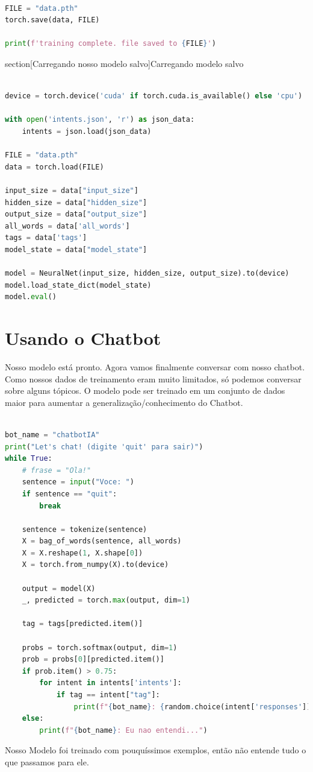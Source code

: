 \begin{lstlisting}[language=Python, caption=Salvando o modelo treinado]

FILE = "data.pth"
torch.save(data, FILE)

print(f'training complete. file saved to {FILE}')

\end{lstlisting}

section[Carregando nosso modelo salvo]{Carregando modelo salvo}

\begin{lstlisting}[language=Python, caption=Carregando modelo salvo]

device = torch.device('cuda' if torch.cuda.is_available() else 'cpu')

with open('intents.json', 'r') as json_data:
    intents = json.load(json_data)

FILE = "data.pth"
data = torch.load(FILE)

input_size = data["input_size"]
hidden_size = data["hidden_size"]
output_size = data["output_size"]
all_words = data['all_words']
tags = data['tags']
model_state = data["model_state"]

model = NeuralNet(input_size, hidden_size, output_size).to(device)
model.load_state_dict(model_state)
model.eval()

\end{lstlisting}

\section[Usando o Chatbot]{Usando o Chatbot}

Nosso modelo está pronto. Agora vamos finalmente conversar com nosso chatbot. Como nossos dados de treinamento eram muito limitados, só podemos conversar sobre alguns tópicos. O modelo pode ser treinado em um conjunto de dados maior para aumentar a generalização/conhecimento do Chatbot.

\begin{lstlisting}[language=Python, caption=Chatbot]

bot_name = "chatbotIA"
print("Let's chat! (digite 'quit' para sair)")
while True:
    # frase = "Ola!"
    sentence = input("Voce: ")
    if sentence == "quit":
        break

    sentence = tokenize(sentence)
    X = bag_of_words(sentence, all_words)
    X = X.reshape(1, X.shape[0])
    X = torch.from_numpy(X).to(device)

    output = model(X)
    _, predicted = torch.max(output, dim=1)

    tag = tags[predicted.item()]

    probs = torch.softmax(output, dim=1)
    prob = probs[0][predicted.item()]
    if prob.item() > 0.75:
        for intent in intents['intents']:
            if tag == intent["tag"]:
                print(f"{bot_name}: {random.choice(intent['responses'])}")
    else:
        print(f"{bot_name}: Eu nao entendi...")


\end{lstlisting}

Nosso Modelo foi treinado com pouquíssimos exemplos, então não entende tudo o que passamos para ele.
